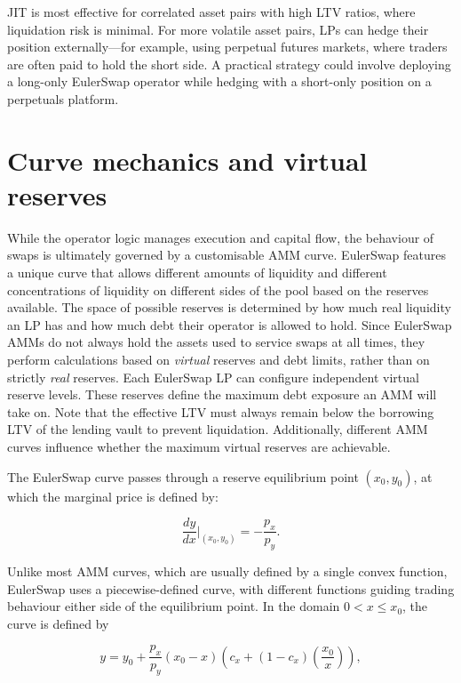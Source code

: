 \documentclass{article}
\begin{document}
JIT is most effective for correlated asset pairs with high LTV ratios, where liquidation risk is minimal. For more volatile asset pairs, LPs can hedge their position externally—for example, using perpetual futures markets, where traders are often paid to hold the short side. A practical strategy could involve deploying a long-only EulerSwap operator while hedging with a short-only position on a perpetuals platform.

\section{Curve mechanics and virtual reserves}

While the operator logic manages execution and capital flow, the behaviour of swaps is ultimately governed by a customisable AMM curve. EulerSwap features a unique curve that allows different amounts of liquidity and different concentrations of liquidity on different sides of the pool based on the reserves available. The space of possible reserves is determined by how much real liquidity an LP has and how much debt their operator is allowed to hold. Since EulerSwap AMMs do not always hold the assets used to service swaps at all times, they perform calculations based on \emph{virtual} reserves and debt limits, rather than on strictly \emph{real} reserves. Each EulerSwap LP can configure independent virtual reserve levels. These reserves define the maximum debt exposure an AMM will take on. Note that the effective LTV must always remain below the borrowing LTV of the lending vault to prevent liquidation. Additionally, different AMM curves influence whether the maximum virtual reserves are achievable.

The EulerSwap curve passes through a reserve equilibrium point $(x_0, y_0)$, at which the marginal price is defined by:

\begin{equation}
\frac{dy}{dx} \Big|_{(x_0, y_0)} = -\frac{p_x}{p_y}.
\end{equation}

Unlike most AMM curves, which are usually defined by a single convex function, EulerSwap uses a piecewise-defined curve, with different functions guiding trading behaviour either side of the equilibrium point. In the domain $0 < x \leq x_0$, the curve is defined by

\begin{equation}
\label{eq:euler-swap-main-y}
y
=
y_{0}+\frac{p_{x}}{p_{y}}\left(x_{0}-x\right)\left(c_{x}+\left(1-c_{x}\right)\left(\frac{x_{0}}{x}\right)\right),
\end{equation}
\end{document}
